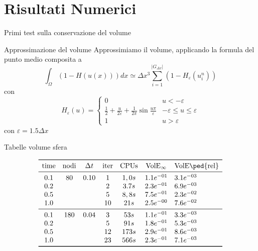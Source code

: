 \section{Risultati Numerici}
\begin{frame}{Primi test sulla conservazione del volume}
  \begin{block}{Approssimazione del volume}
    Approssimiamo il volume, applicando la formula del punto medio
    composita a
    \[
    \int_{\Omega}(1-H(u(x)))dx\simeq\Delta x^3\sum_{i=1}^{|G_{\Delta x}|}(1-H_{\varepsilon}(u_i^n))
    \]
    con
    \[
    H_{\varepsilon}(u)=
    \begin{cases}
      0 &u<-\varepsilon \\
      \frac{1}{2}+\frac{u}{2\varepsilon}+\frac{1}{2\pi}\sin{\frac{u\pi}{\varepsilon}}
        &-\varepsilon\leq u\leq\varepsilon \\
        1 &u>\varepsilon
    \end{cases}
    \]
 con $\varepsilon=1.5\Delta x$
  \end{block}
\end{frame}

\begin{frame}{Tabelle volume sfera}
\begin{table}[htb!]
\caption{Tabella per lo schema VPMCM. Evoluzione di una sfera.}
\label{tab:cp4-sc1-01}
\[
\begin{array}{*{6}{c}l}
    \toprule
    \text{time} &\text{nodi} &\Delta t &\text{iter}
    &\text{CPUs}&\text{VolE$_{\infty}$} &\text{VolE\ped{rel}} \\
     \midrule
     0.1        & 80         & 0.10    & 1          & 1,0s
     &1.1e^{-01} & 3.1e^{-03} \\ 
     0.2        &            &         & 2          & 3.7s
     &2.3e^{-01} & 6.9e^{-03} \\
     0.5        &            &         & 5          & 8,8s
     &7.5e^{-01} & 2.3e^{-02} \\ 
     1.0        &            &         & 10         & 21s
     &2.5e^{-00} & 7.6e^{-02} \\
    \midrule
     0.1        & 180        & 0.04    & 3          & 53s
     &1.1e^{-01} & 3.3e^{-03} \\ 
     0.2        &            &         & 5          & 91s
     &1.8e^{-01} & 5.3e^{-03} \\
     0.5        &            &         & 12         & 173s
     &2.9e^{-01} & 8.6e^{-03}  \\ 
     1.0        &            &         & 23         & 566s
     &2.3e^{-01} & 7.1e^{-03}  \\
    \bottomrule
\end{array}
\]
\end{table}
\end{frame}

